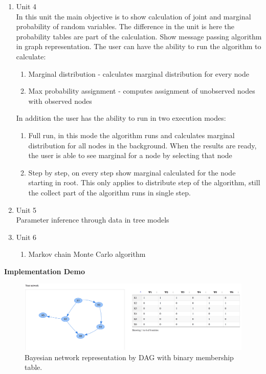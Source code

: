 \documentclass{article}
\begin{document}
\begin{enumerate}
        \item Unit 4\\
            In this unit the main objective is to show calculation of joint and marginal probability of random variables. The difference in the unit is here the probability tables are part of the calculation.
            Show message passing algorithm in graph representation. The user can have the ability to run the algorithm to calculate:
            \begin{enumerate}
                \item Marginal distribution - calculates marginal distribution for every node
                \item Max probability assignment - computes assignment of unobserved nodes with observed nodes 
            \end{enumerate}
            In addition the user has the ability to run in two execution modes: 
            \begin{enumerate}
                \item Full run, in this mode the algorithm runs and calculates marginal distribution for all nodes in the background. When the results are ready, the user is able to see marginal for a node by selecting that node
                \item Step by step, on every step show marginal calculated for the node starting in root. This only applies to distribute step of the algorithm, still the collect part of the algorithm runs in single step.
            \end{enumerate}
        \item Unit 5 \\
            Parameter inference through data in tree models
        \item Unit 6\\
        \begin{enumerate}
            \item Markov chain Monte Carlo algorithm
        \end{enumerate}
    \end{enumerate}

    \textbf{Implementation Demo}
    \begin{figure}[h!]
        \includegraphics[width=\linewidth]{img/network_binary_matrix.png}
        \caption{Bayesian network representation by DAG with binary membership table.}
        \label{fig:besian_network}
    \end{figure}
\end{document}
